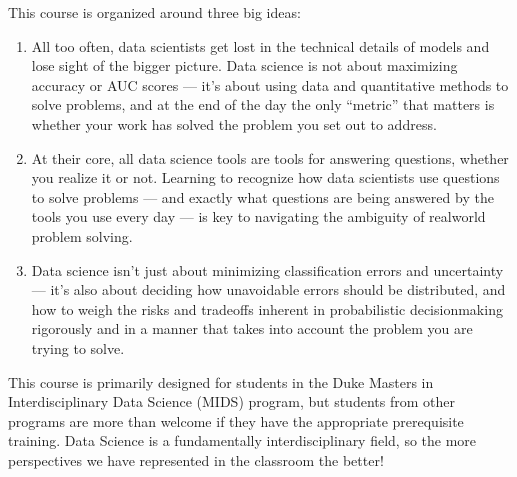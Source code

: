 \documentclass[letterpaper,10pt,english]{jupyterBook}
\begin{document}
\sphinxAtStartPar
This course is organized around three big ideas:
\begin{enumerate}
%
\item {} 
\sphinxAtStartPar
{} All too often, data scientists get lost in the technical details of models and lose sight of the bigger picture. Data science is not about maximizing accuracy or AUC scores — it’s about using data and quantitative methods to solve problems, and at the end of the day the only “metric” that matters is whether your work has solved the problem you set out to address.

\item {} 
\sphinxAtStartPar
{} At their core, all data science tools are tools for answering questions, whether you realize it or not. Learning to recognize how data scientists use questions to solve problems — and exactly what questions are being answered by the tools you use every day — is key to navigating the ambiguity of real\sphinxhyphen{}world problem solving.

\item {} 
\sphinxAtStartPar
{} Data science isn’t just about minimizing classification errors and uncertainty — it’s also about deciding how unavoidable errors should be distributed, and how to weigh the risks and trade\sphinxhyphen{}offs inherent in probabilistic decision\sphinxhyphen{}making rigorously and in a manner that takes into account the problem you are trying to solve.

\end{enumerate}

\begin{DUlineblock}{0em}
\item[] 
\end{DUlineblock}

\sphinxAtStartPar
This course is primarily designed for students in the Duke Masters in Interdisciplinary Data Science (MIDS) program, but students from other programs are more than welcome if they have the appropriate pre\sphinxhyphen{}requisite training. Data Science is a fundamentally interdisciplinary field, so the more perspectives we have represented in the classroom the better!
\end{document}
